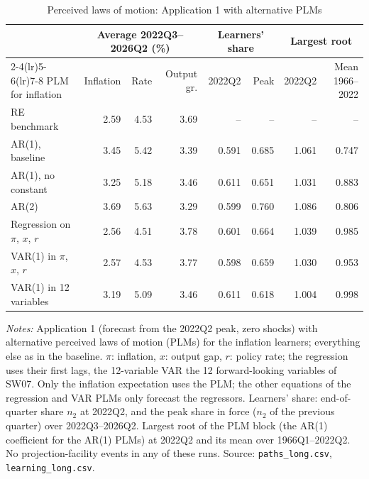 \begin{table}[tbp]
\centering
\small
\caption{Perceived laws of motion: Application 1 with alternative PLMs}
\label{tab:plm}
\begin{tabular}{lrrrrrrr}
\toprule
& \multicolumn{3}{c}{Average 2022Q3--2026Q2 (\%)} & \multicolumn{2}{c}{Learners' share} & \multicolumn{2}{c}{Largest root} \\
\cmidrule(lr){2-4}\cmidrule(lr){5-6}\cmidrule(lr){7-8}
PLM for inflation & Inflation & Rate & Output gr. & 2022Q2 & Peak & 2022Q2 & Mean 1966--2022 \\
\midrule
RE benchmark & 2.59 & 4.53 & 3.69 & -- & -- & -- & -- \\
\addlinespace
AR(1), baseline & 3.45 & 5.42 & 3.39 & 0.591 & 0.685 & 1.061 & 0.747 \\
AR(1), no constant & 3.25 & 5.18 & 3.46 & 0.611 & 0.651 & 1.031 & 0.883 \\
AR(2) & 3.69 & 5.63 & 3.29 & 0.599 & 0.760 & 1.086 & 0.806 \\
Regression on $\pi$, $x$, $r$ & 2.56 & 4.51 & 3.78 & 0.601 & 0.664 & 1.039 & 0.985 \\
VAR(1) in $\pi$, $x$, $r$ & 2.57 & 4.53 & 3.77 & 0.598 & 0.659 & 1.030 & 0.953 \\
VAR(1) in 12 variables & 3.19 & 5.09 & 3.46 & 0.611 & 0.618 & 1.004 & 0.998 \\
\bottomrule
\end{tabular}
\par\smallskip
\begin{minipage}{\linewidth}\footnotesize
\textit{Notes:} Application 1 (forecast from the 2022Q2 peak, zero shocks) with alternative perceived laws of motion (PLMs) for the inflation learners; everything else as in the baseline. $\pi$: inflation, $x$: output gap, $r$: policy rate; the regression uses their first lags, the 12-variable VAR the 12 forward-looking variables of SW07. Only the inflation expectation uses the PLM; the other equations of the regression and VAR PLMs only forecast the regressors. Learners' share: end-of-quarter share $n_2$ at 2022Q2, and the peak share in force ($n_2$ of the previous quarter) over 2022Q3--2026Q2. Largest root of the PLM block (the AR(1) coefficient for the AR(1) PLMs) at 2022Q2 and its mean over 1966Q1--2022Q2. No projection-facility events in any of these runs. Source: \texttt{paths\_long.csv}, \texttt{learning\_long.csv}.
\end{minipage}
\end{table}
